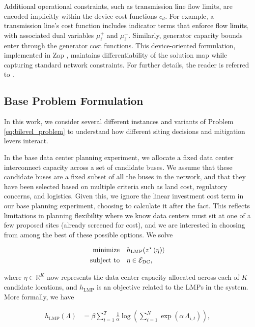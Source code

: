 Additional operational constraints, such as transmission line flow limits, are encoded implicitly within the device cost functions $c_d$. For example, a transmission line's cost function includes indicator terms that enforce flow limits, with associated dual variables $\mu_\ell^+$ and $\mu_\ell^-$. Similarly, generator capacity bounds enter through the generator cost functions. This device-oriented formulation, implemented in Zap \cite{degleris2024gpu}, maintains differentiability of the solution map while capturing standard network constraints. For further details, the reader is referred to \cite{degleris2024gpu}.

\subsection{Base Problem Formulation}
In this work, we consider several different instances and variants of Problem \ref{eq:bilevel_problem} to understand how different siting decisions and mitigation levers interact. 

In the base data center planning experiment, we allocate a fixed data center interconnect capacity across a set of candidate buses. We assume that these candidate buses are a fixed subset of all the buses in the network, and that they have been selected based on multiple criteria such as land cost, regulatory concerns, and logistics. Given this, we ignore the linear investment cost term in our base planning experiment, choosing to calculate it after the fact. This reflects limitations in planning flexibility where we know data centers must sit at one of a few proposed sites (already screened for cost), and we are interested in choosing from among the best of these possible options. We solve

\begin{equation}
\begin{aligned}
\text{minimize}\quad &  h_{\text{LMP}}(z^{\star}\left(\eta)\right) \\
\text{subject to}\quad & \eta \in \mathcal{E}_{\text{DC}},
\label{eq:dc_plan}
\end{aligned}
\end{equation}

where $\eta \in \mathbb{R}^K$ now represents the data center capacity allocated across each of $K$ candidate locations, and $h_{\text{LMP}}$ is an objective related to the LMPs in the system. More formally, we have

\begin{equation}
\begin{aligned}
h_{\text{LMP}}(\Lambda)
&=
\beta \sum_{t=1}^{T}\frac{1}{\alpha}\log\!\left(\sum_{i=1}^{N}\exp\!\left(\alpha\,\Lambda_{i,t}\right)\right),
\end{aligned}
\label{eq:h_lmp}
\end{equation}

